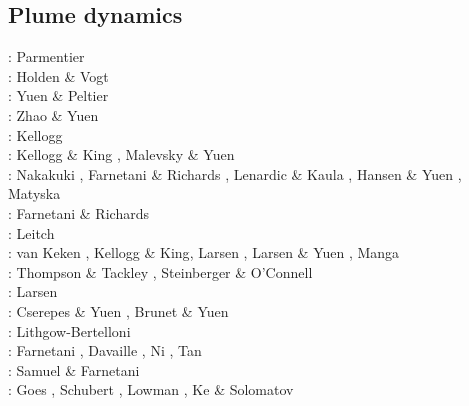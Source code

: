 \subsection{Plume dynamics}

\begin{scriptsize}
\noindent
\nineteenseventyfive: Parmentier \etal \cite{patt75}\\
\nineteenseventyseven: Holden \& Vogt \cite{hovo77}\\
\nineteeneighty: Yuen \& Peltier \cite{yupe80}\\
\nineteeneightyseven: Zhao \& Yuen \cite{zhyu87}\\
\nineteenninetyone: Kellogg \cite{kell91}\\
\nineteenninetythree: Kellogg \& King \cite{keki93}, Malevsky \& Yuen \cite{mayu93}\\
\nineteenninetyfour: Nakakuki \etal \cite{nasf94}, Farnetani \& Richards \cite{fari94},
                     Lenardic \& Kaula \cite{leka94b}, Hansen \& Yuen \cite{hayu94},
                     Matyska \etal \cite{mamy94}\\
\nineteenninetyfive: Farnetani \& Richards \cite{fari95}\\
\nineteenninetysix: Leitch \etal \cite{lesy96} \\
\nineteenninetyseven: van Keken \cite{vank97}, Kellogg \& King\cite{keki97},
                      Larsen \etal \cite{laym97}, Larsen \& Yuen \cite{layu97,layu97b},
                      Manga \cite{mang97}\\
\nineteenninetyeight: Thompson \& Tackley \cite{thta98}, Steinberger \& O'Connell \cite{stoc98}\\
\nineteenninetynine: Larsen \etal \cite{lays99}\\
\twothousand: Cserepes \& Yuen \cite{csyu00}, Brunet \& Yuen \cite{bryu00}\\
\twothousandone: Lithgow-Bertelloni \cite{lirc01}\\
\twothousandtwo: Farnetani \etal \cite{falt02}, Davaille \etal \cite{dagl02},
                 Ni \etal \cite{nitg02}, Tan \etal \cite{tagh02}\\
\twothousandthree: Samuel \& Farnetani \cite{safa03}\\
\twothousandfour: Goes \etal \cite{goch04}, Schubert \etal \cite{scmo04}, Lowman \etal \cite{lokg04},
                  Ke \& Solomatov \cite{keso04} \\

\end{scriptsize}
